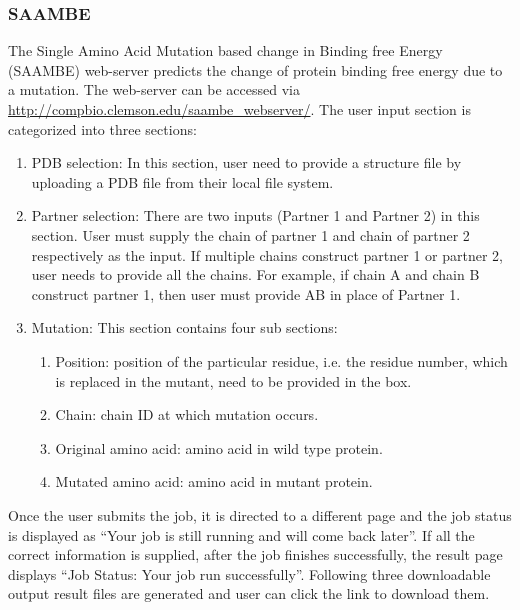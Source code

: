 \documentclass[9pt,tutorial,pubversion]{livecoms}
\begin{document}
\subsubsection{SAAMBE}
The Single Amino Acid Mutation based change in Binding free Energy (SAAMBE)\cite{petukh2015predicting} web-server predicts the change of protein binding free energy due to a mutation. The web-server\cite{petukh2015predicting,petukh2016saambe} can be accessed via \url{http://compbio.clemson.edu/saambe_webserver/}. 
The user input section is categorized into three sections:
\begin{enumerate}
    \item PDB selection: In this section, user need to provide a structure file by uploading a PDB file from their local file system.
    
    \item Partner selection: There are two inputs (Partner 1 and Partner 2) in this section. User must supply the chain of partner 1 and chain of partner 2 respectively as the input. If multiple chains construct partner 1 or partner 2, user needs to provide all the chains. For example, if chain A and chain B construct partner 1, then user must provide AB in place of Partner 1.
    
    \item Mutation: This section contains four sub sections:
    \begin{enumerate}
	    \item Position: position of the particular residue, i.e. the residue number, which is replaced in the mutant, need to be provided in the box.
	    
	    \item Chain: chain ID at which mutation occurs.
	    
	    \item Original amino acid: amino acid in wild type protein.
	    
	    \item Mutated amino acid: amino acid in mutant protein.
    \end{enumerate}
\end{enumerate}
Once the user submits the job, it is directed to a different page and the job status is displayed as ``Your job is still running and will come back later''. If all the correct information is supplied, after the job finishes successfully, the result page displays “Job Status: Your job run successfully”. Following three downloadable output result files are generated and user can click the link to download them.
\end{document}
